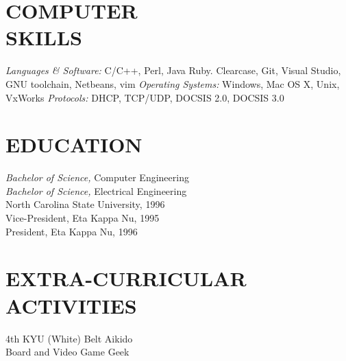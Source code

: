 \documentclass[line,margin]{res}
\begin{document}
\begin{resume}
 
\section{COMPUTER \\ SKILLS} {\sl Languages \& Software:} C/C++, Perl, Java
                Ruby. Clearcase, Git, Visual Studio, GNU toolchain, Netbeans, vim
                {\sl Operating Systems:} Windows, Mac OS X, Unix, VxWorks
                {\sl Protocols:} DHCP, TCP/UDP, DOCSIS 2.0, DOCSIS 3.0
 
 
\section{EDUCATION} {\sl Bachelor of Science,} Computer Engineering \\
                    {\sl Bachelor of Science,} Electrical Engineering \\
                North Carolina State University, 1996 \\
                Vice-President, Eta Kappa Nu, 1995 \\ 
                President, Eta Kappa Nu, 1996 \\
 
 
\section{EXTRA-CURRICULAR \\ ACTIVITIES}             
            4th KYU (White) Belt Aikido \\
            Board and Video Game Geek \\

\end{resume}
\end{document}

